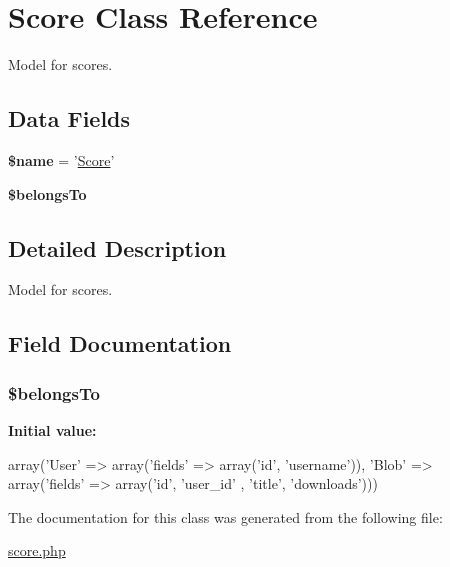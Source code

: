 \hypertarget{class_score}{
\section{Score Class Reference}
\label{class_score}
}


Model for scores.  


\subsection*{Data Fields}
\begin{DoxyCompactItemize}
\item 
\hypertarget{class_score_ab2fc40d43824ea3e1ce5d86dee0d763b}{
{\bfseries \$name} = '\hyperlink{class_score}{Score}'}
\label{class_score_ab2fc40d43824ea3e1ce5d86dee0d763b}

\item 
{\bfseries \$belongsTo}
\end{DoxyCompactItemize}


\subsection{Detailed Description}
Model for scores. 

\subsection{Field Documentation}
\hypertarget{class_score_a1578683643768f402aa354aabf0c1c31}{
\subsubsection[{\$belongsTo}]{\setlength{\rightskip}{0pt plus 5cm}\$belongsTo}}
\label{class_score_a1578683643768f402aa354aabf0c1c31}
{\bfseries Initial value:}
\begin{DoxyCode}
 array('User' => array('fields' => array('id', 'username')), 
                                'Blob' => array('fields' => array('id', 'user_id'
      , 'title', 'downloads')))
\end{DoxyCode}


The documentation for this class was generated from the following file:\begin{DoxyCompactItemize}
\item 
\hyperlink{score_8php}{score.php}\end{DoxyCompactItemize}
